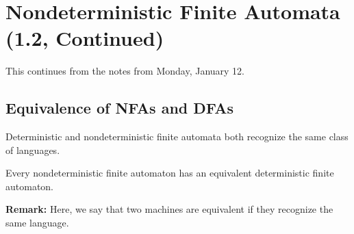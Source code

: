 \documentclass[letterpaper]{article}
\begin{document}
\section{Nondeterministic Finite Automata (1.2, Continued)}
This continues from the notes from Monday, January 12.

\subsection{Equivalence of NFAs and DFAs}
Deterministic and nondeterministic finite automata both recognize the same class of languages.

\begin{theorem}{}{}
    Every nondeterministic finite automaton has an equivalent deterministic finite automaton.
\end{theorem}
\textbf{Remark:} Here, we say that two machines are equivalent if they recognize the same language. 

\bigskip 
\end{document}

